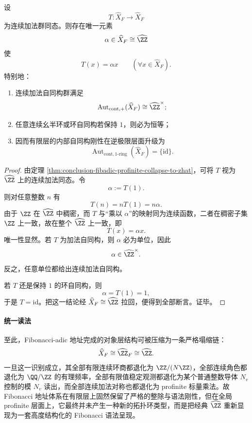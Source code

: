 \begin{theorem}[全局地址完成的连续自同态分类]\label{thm:conclusion-fibadic-global-continuous-endomorphism-classification}
设
\[
T:\widehat X_F\longrightarrow \widehat X_F
\]
为连续加法群同态。则存在唯一元素
\[
\alpha\in \widehat X_F\cong \widehat{\ZZ}
\]
使
\[
T(x)=\alpha x
\qquad
(\forall x\in \widehat X_F).
\]
特别地：
\begin{enumerate}
  \item 连续加法自同构群满足
  \[
  \operatorname{Aut}_{\mathrm{cont},+}(\widehat X_F)\cong \widehat{\ZZ}^{\times};
  \]
  \item 任意连续幺半环或环自同构若保持 \(1\)，则必为恒等；
  \item 因而有限层的内部自同构刚性在逆极限层面升级为
  \[
  \operatorname{Aut}_{\mathrm{cont},1\text{-ring}}(\widehat X_F)=\{\mathrm{id}\}.
  \]
\end{enumerate}
\end{theorem}
\begin{proof}
由定理 \ref{thm:conclusion-fibadic-profinite-collapse-to-zhat}，可将 \(T\) 视为 \(\widehat{\ZZ}\) 上的连续加法同态。令
\[
\alpha:=T(1).
\]
则对任意整数 \(n\) 有
\[
T(n)=nT(1)=n\alpha.
\]
由于 \(\ZZ\) 在 \(\widehat{\ZZ}\) 中稠密，而 \(T\) 与“乘以 \(\alpha\)”的映射同为连续函数，二者在稠密子集 \(\ZZ\) 上一致，故在整个 \(\widehat{\ZZ}\) 上一致，即
\[
T(x)=\alpha x.
\]
唯一性显然。若 \(T\) 为加法自同构，则 \(\alpha\) 必为单位，因此
\[
\alpha\in \widehat{\ZZ}^{\times}.
\]
反之，任意单位都给出连续加法自同构。

若 \(T\) 还是保持 \(1\) 的环自同构，则
\[
\alpha=T(1)=1,
\]
于是 \(T=\mathrm{id}\)。把这一结论经 \(\widehat X_F\cong \widehat{\ZZ}\) 拉回，便得到全部断言。证毕。
\end{proof}

\paragraph{统一读法}
至此，Fibonacci-adic 地址完成的对象层结构可被压缩为一条严格塌缩链：
\[
\widehat X_F
\cong
\widehat{\ZZ}_F
\cong
\widehat{\ZZ}.
\]
一旦这一识别成立，其全部有限连续环商都退化为 \(\ZZ/(N\ZZ)\)，全部连续角色都退化为 \(\QQ/\ZZ\) 的有理频率，全部有限值稳定观测都退化为某个普通整数导体 \(N_v\) 控制的模 \(N_v\) 读出，而全部连续加法对称也都退化为 profinite 标量乘法。故 Fibonacci 地址体系在有限层上固然保留了严格的整除与语法刚性，但在全局 profinite 层面上，它最终并未产生一种新的拓扑环类型，而是把经典 \(\widehat{\ZZ}\) 重新显现为一套高度结构化的 Fibonacci 语法呈现。

\endinput
